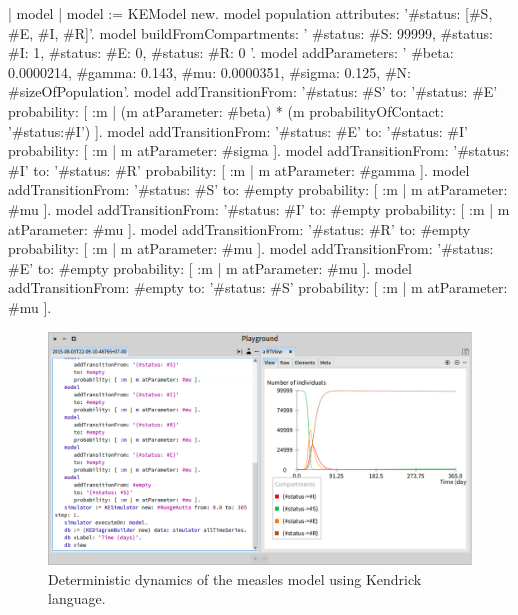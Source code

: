 \documentclass[a4paper,10pt,twoside]{book}
\begin{document}

\begin{code}{}
  | model |
	model := KEModel new.
	model population attributes: '{#status: [#S, #E, #I, #R]}'.
	model
		buildFromCompartments:
			'{
		{#status: #S}: 99999,
		{#status: #I}: 1,
		{#status: #E}: 0,
		{#status: #R}: 0
	}'.
	model addParameters: '{
		#beta: 0.0000214,
		#gamma: 0.143,
		#mu: 0.0000351,
		#sigma: 0.125,
		#N: #sizeOfPopulation}'.
	model
		addTransitionFrom: '{#status: #S}'
		to: '{#status: #E}'
		probability: [ :m | (m atParameter: #beta) * (m probabilityOfContact: '{#status:#I}') ].
	model
		addTransitionFrom: '{#status: #E}'
		to: '{#status: #I}'
		probability: [ :m | m atParameter: #sigma ].
	model
		addTransitionFrom: '{#status: #I}'
		to: '{#status: #R}'
		probability: [ :m | m atParameter: #gamma ].
	model
		addTransitionFrom: '{#status: #S}'
		to: #empty
		probability: [ :m | m atParameter: #mu ].
	model
		addTransitionFrom: '{#status: #I}'
		to: #empty
		probability: [ :m | m atParameter: #mu ].
	model
		addTransitionFrom: '{#status: #R}'
		to: #empty
		probability: [ :m | m atParameter: #mu ].
	model
		addTransitionFrom: '{#status: #E}'
		to: #empty
		probability: [ :m | m atParameter: #mu ].
	model
		addTransitionFrom: #empty
		to: '{#status: #S}'
		probability: [ :m | m atParameter: #mu ].
\end{code}



\begin{figure}

\begin{center}
\includegraphics[width=1.0\textwidth]{figures/SEIR_RK4.png}\caption{Deterministic dynamics of the measles model using Kendrick language.\label{SEIR_RK4}}\end{center}
\end{figure}
\end{document}
